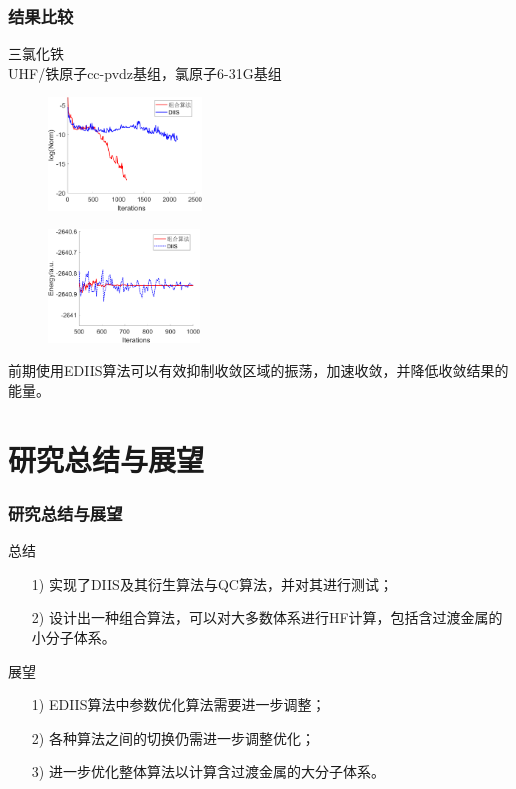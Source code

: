 \documentclass[10pt,aspectratio=43,mathserif,UTF8]{beamer}
\begin{document}
\begin{frame}
	\frametitle{结果比较}
	三氯化铁\\
	UHF/铁原子cc-pvdz基组，氯原子6-31G基组
	\begin{figure}[ht!]
		\centering
		\begin{minipage}{0.4\linewidth}
			\centering
			\includegraphics[height=3cm]{figure/FeCl3/NORM2.png}
			\label{fig:FeCl3:E}
		\end{minipage}
		\begin{minipage}{0.4\linewidth}
			\centering
			\includegraphics[height=3cm]{figure/FeCl3/FD6.png}
			\label{fig:FeCl3:FD}
		\end{minipage}
	\end{figure}
	前期使用EDIIS算法可以有效抑制收敛区域的振荡，加速收敛，并降低收敛结果的能量。
\end{frame}

\section{研究总结与展望}

\begin{frame}
	\frametitle{研究总结与展望}
	总结
	\begin{itemize}
		\item[1)]
		 实现了DIIS及其衍生算法与QC算法，并对其进行测试；
		\item[2)] 
		 设计出一种组合算法，可以对大多数体系进行HF计算，包括含过渡金属的小分子体系。
	\end{itemize}
	
	展望
	\begin{itemize}
		\item [1)]
		EDIIS算法中参数优化算法需要进一步调整；
		\item [2)]
		各种算法之间的切换仍需进一步调整优化；
		\item [3)]
		进一步优化整体算法以计算含过渡金属的大分子体系。
	\end{itemize}
\end{frame}
\end{document}
